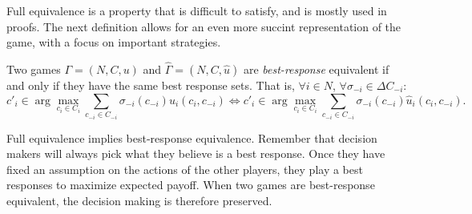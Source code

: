 Full equivalence is a property that is difficult to satisfy, and is mostly used in proofs.
 The next definition allows for an even more succint representation of the game, with a focus on important strategies.
\begin{definition}
Two games $\Gamma=(N, C, u)$ and $\hat \Gamma = (N,C, \hat u)$  are  \textit{best-response} equivalent if and only if
they have the same best response sets.
That is,
$\forall i \in N$, $\forall \sigma_{-i} \in \Delta C_{-i}:$\\
$$ c'_i \in \arg \max_{c_i \in C_i} \sum_{c_{-i} \in C_{-i}}
\sigma_{-i}(c_{-i}) u_i(c_i, c_{-i}) \Leftrightarrow c'_i \in \arg \max_{c_i \in C_i} \sum_{c_{-i} \in C_{-i}}
\sigma_{-i}(c_{-i}) \hat{u}_i(c_i, c_{-i}).
$$
\end{definition}

Full equivalence implies best-response equivalence.
Remember that decision makers will always pick what they believe is a best response. Once they have fixed an assumption on the actions of the other players, they play a best responses to maximize expected payoff.
When two games are best-response equivalent, the decision making is therefore preserved.


